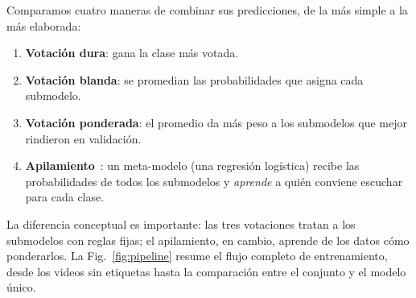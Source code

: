 \documentclass[runningheads]{llncs}
\begin{document}
Comparamos cuatro maneras de combinar sus predicciones, de la más simple a la
más elaborada:
\begin{enumerate}
  \item \textbf{Votación dura}: gana la clase más votada.
  \item \textbf{Votación blanda}: se promedian las probabilidades que asigna
        cada submodelo.
  \item \textbf{Votación ponderada}: el promedio da más peso a los submodelos
        que mejor rindieron en validación.
  \item \textbf{Apilamiento}~\cite{wolpert1992stacked}: un meta-modelo (una
        regresión logística) recibe las probabilidades de todos los submodelos
        y \emph{aprende} a quién conviene escuchar para cada clase.
\end{enumerate}
La diferencia conceptual es importante: las tres votaciones tratan a los
submodelos con reglas fijas; el apilamiento, en cambio, aprende de los datos
cómo ponderarlos. La Fig.~\ref{fig:pipeline} resume el flujo completo de
entrenamiento, desde los videos sin etiquetas hasta la comparación entre el
conjunto y el modelo único.
\end{document}

